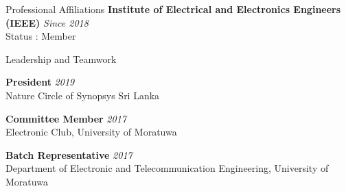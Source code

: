 \documentclass[
11pt, %
]{./assets/resume} %
\begin{document}
\begin{rSection}{Professional Affiliations}
	\textbf{Institute of Electrical and Electronics Engineers (IEEE)} \hfill \textit{Since 2018}\\
	Status : Member
	
\end{rSection}


\begin{rSection}{Leadership and Teamwork}

\textbf{President} \hfill \textit{2019} \\
Nature Circle of Synopsys Sri Lanka


\textbf{Committee Member} \hfill \textit{2017} \\
Electronic Club, University of Moratuwa

\textbf{Batch Representative} \hfill \textit{2017} \\
Department of Electronic and Telecommunication Engineering, University of Moratuwa

\end{rSection}
\end{document}

